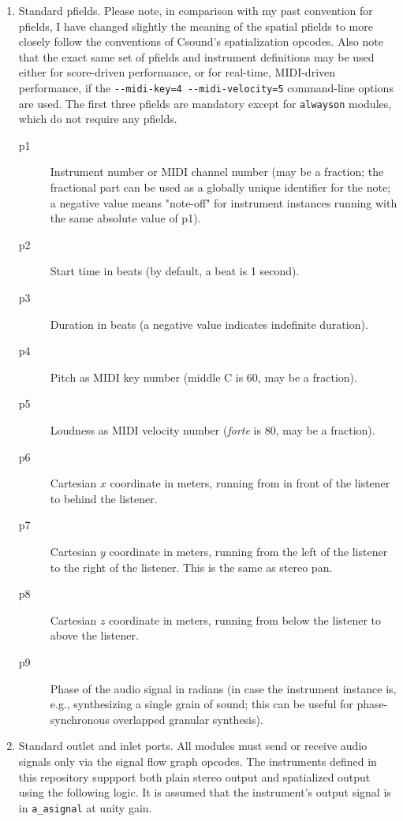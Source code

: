 \documentclass[12pt,letterpaper,onecolumn]{scrartcl}
\begin{document}
\begin{enumerate}
	\item Standard pfields. Please note, in comparison with my past convention
	for pfields, I have changed slightly the meaning of the spatial pfields to
more closely follow the conventions of Csound's spatialization opcodes. Also
note that the exact same set of pfields and instrument definitions may be used
either for score-driven performance, or for real-time, MIDI-driven performance,
if the \texttt{-\--midi-key=4 -\--midi-velocity=5} command-line options are
used. The first three pfields are mandatory except for \texttt{alwayson}
modules, which do not require any pfields.
        \begin{description}
			\item[p1]	Instrument number or MIDI channel number (may be a
			fraction; the fractional part can be used as a globally unique
identifier for the note; a negative value means "note-off" for instrument
instances running with the same absolute value of p1).
			\item[p2] 	Start time in beats (by default, a beat is 1 second).
			\item[p3] 	Duration in beats (a negative value indicates
			indefinite duration).
			\item[p4] 	Pitch as MIDI key number (middle C is 60, may be a
			fraction).
			\item[p5] 	Loudness as MIDI velocity number (\emph{forte} is 80,
			may be a fraction).
			\item[p6] 	Cartesian $x$ coordinate in meters, running from in
			front of the listener to behind the listener.
			\item[p7] 	Cartesian $y$ coordinate in meters, running from the
			left of the listener to the right of the listener. This is the
same as stereo pan.
			\item[p8] 	Cartesian $z$ coordinate in meters, running from below
			the listener to above the listener.
			\item[p9] 	Phase of the audio signal in radians (in case the
			instrument instance is, e.g., synthesizing a single grain of sound;
this can be useful for phase-synchronous overlapped granular synthesis).
        \end{description}
	\item Standard outlet and inlet ports. All modules must send or receive
	audio signals only via the signal flow graph opcodes. The instruments
	defined in this repository suppport both plain stereo output and
	spatialized output using the following logic. It is assumed that the
	instrument's output signal is in \texttt{a\_asignal} at unity gain.


\end{enumerate}
\end{document}
